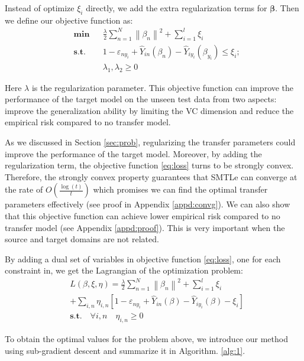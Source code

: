 Instead of optimize $\xi_i$ directly, we add the extra regularization terms for $\boldsymbol{\beta}$. Then we define our objective function as:
\begin{equation}\label{eq:loss}
\begin{aligned}
& \textbf{min}
& & \frac{{{\lambda}}}{2}\sum\limits_{n = 1}^N {{{\left\| {{\beta _{n}}} \right\|}^2}}  + \sum\limits_{i = 1}^l {{\xi _i}}   \\
& \textbf{s.t.}
& & 1 - {\varepsilon _{n{y_i}}} + {\hat Y_{in}}\left( {\beta_n } \right) - {\hat Y_{i{y_i}}}\left( {\beta_{y_i} } \right) \le {\xi_i};\\
& & &\lambda_1,\lambda_2 \ge 0
\end{aligned}
\end{equation}

Here $\lambda$ is the regularization parameter. This objective function can improve the performance of the target model on the unseen test data from two aspects: improve the generalization ability by limiting the VC dimension and reduce the empirical risk compared to no transfer model.

As we discussed in Section \ref{sec:prob}, regularizing the transfer parameters could improve the performance of the target model. Moreover, by adding the regularization term, the objective function \eqref{eq:loss} turns to be strongly convex. Therefore, the strongly convex property guarantees that SMTLe can converge at the rate of $O(\frac{\log(t)}{t})$ which promises we can find the optimal transfer parameters effectively (see proof in Appendix \ref{appd:convg}).
We can also show that this objective function can achieve lower empirical risk compared to no transfer model (see Appendix \ref{appd:proof}). This is very important when the source and target domains are not related.

 
By adding a dual set of variables in objective function \eqref{eq:loss}, one for each constraint in, we get the Lagrangian of the optimization problem:
\begin{equation}\label{eq:dual}
\begin{aligned}
 &L\left( {\beta ,\xi ,\eta } \right) =
 \frac{{{\lambda}}}{2}\sum\limits_{n = 1}^N {{{\left\| {{\beta _n}} \right\|}^2}}  + \sum\limits_{i = 1}^l {{\xi _i}} \\
   &+ \sum\limits_{i,n} {{\eta _{i,n}}\left[ {1 - {\varepsilon _{n{y_i}}} + {{\hat Y}_{in}}\left( {\beta } \right) - {{\hat Y}_{i{y_i}}}\left( {\beta } \right) - {\xi _i}} \right]}  \\
 &\textbf{s.t.} \quad  \forall i,n \quad {} {\eta _{i,n}} \ge 0
\end{aligned}
\end{equation}

To obtain the optimal values for the problem above, we introduce our method using sub-gradient descent \cite{BoydCO} and summarize it in Algorithm. \ref{alg:1}. 

